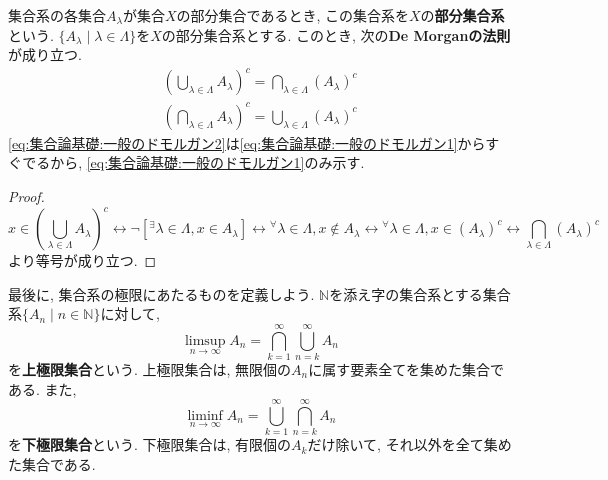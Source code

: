 \documentclass[a4j,dvipdfmx]{jsarticle}
\numberwithin{equation}{section}
\begin{document}
            集合系の各集合$A_\lambda$が集合$X$の部分集合であるとき, この集合系を$X$の\textbf{部分集合系}という. $\{A_\lambda\mid \lambda\in\Lambda\}$を$X$の部分集合系とする.
            このとき, 次の\textbf{De Morganの法則}が成り立つ.
            \begin{align}
                \left(\bigcup_{\lambda\in\Lambda}A_\lambda\right)^c=\bigcap_{\lambda\in\Lambda}(A_\lambda)^c \label{eq:集合論基礎:一般のドモルガン1}\\
                \left(\bigcap_{\lambda\in\Lambda}A_\lambda\right)^c=\bigcup_{\lambda\in\Lambda}(A_\lambda)^c \label{eq:集合論基礎:一般のドモルガン2}
            \end{align}
            \eqref{eq:集合論基礎:一般のドモルガン2}は\eqref{eq:集合論基礎:一般のドモルガン1}からすぐでるから, \eqref{eq:集合論基礎:一般のドモルガン1}のみ示す.
            \begin{proof}
                \begin{equation*}
                    x\in \left(\bigcup_{\lambda\in\Lambda}A_\lambda\right)^c \leftrightarrow \lnot [{}^\exists\lambda\in\Lambda,x\in A_\lambda]\leftrightarrow{}^\forall\lambda\in\Lambda,x\not\in A_\lambda\leftrightarrow{}^\forall\lambda\in\Lambda,x\in (A_\lambda)^c\leftrightarrow \bigcap_{\lambda\in\Lambda}(A_\lambda)^c
                \end{equation*}
                より等号が成り立つ.
            \end{proof}
            最後に, 集合系の極限にあたるものを定義しよう. $\mathbb{N}$を添え字の集合系とする集合系$\{A_n\mid n\in\mathbb{N}\}$に対して, 
            \begin{equation}
                \limsup_{n\to\infty}A_n=\bigcap_{k=1}^{\infty}\bigcup_{n=k}^\infty A_n \label{eq:集合論基礎:集合のlimsup}
            \end{equation}
            を\textbf{上極限集合}という. 上極限集合は, 無限個の$A_n$に属す要素全てを集めた集合である. また, 
            \begin{equation}
                \liminf_{n\to\infty}A_n=\bigcup_{k=1}^{\infty}\bigcap_{n=k}^\infty A_n \label{eq:集合論基礎:集合のliminf}
            \end{equation}
            を\textbf{下極限集合}という. 下極限集合は, 有限個の$A_k$だけ除いて, それ以外を全て集めた集合である. 
\end{document}
